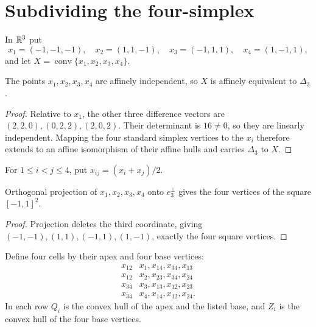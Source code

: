 \section{Subdividing the four-simplex}

\begin{definition}
  \label{constr:tetrahedron}
  In $\mathbb{R}^3$ put
  \[
  x_1=(-1,-1,-1),\quad x_2=(1,1,-1),\quad
  x_3=(-1,1,1),\quad x_4=(1,-1,1),
  \]
  and let $X=\operatorname{conv}\{x_1,x_2,x_3,x_4\}$.
\end{definition}

\begin{lemma}
  \label{lem:tetrahedron-simplex}
  The points $x_1,x_2,x_3,x_4$ are affinely independent, so $X$ is affinely
  equivalent to $\Delta_3$.
\end{lemma}
\begin{proof}
  Relative to $x_1$, the other three difference vectors are
  $(2,2,0),(0,2,2),(2,0,2)$.  Their determinant is $16\neq0$, so they are
  linearly independent.  Mapping the four standard simplex vertices to the
  $x_i$ therefore extends to an affine isomorphism of their affine hulls and
  carries $\Delta_3$ to $X$.
\end{proof}

\begin{definition}
  \label{def:tetrahedron-midpoints}
  For $1\leq i<j\leq4$, put $x_{ij}=(x_i+x_j)/2$.
\end{definition}

\begin{lemma}
  \label{lem:tetrahedron-projection-square}
  Orthogonal projection of $x_1,x_2,x_3,x_4$ onto $e_3^\perp$ gives the four
  vertices of the square $[-1,1]^2$.
\end{lemma}
\begin{proof}
  Projection deletes the third coordinate, giving
  $(-1,-1),(1,1),(-1,1),(1,-1)$, exactly the four square vertices.
\end{proof}

\begin{definition}
  \label{constr:rhombic-cells}
  Define four cells by their apex and four base vertices:
  \[
  \begin{array}{c|c}
  x_{12}&x_1,x_{14},x_{34},x_{13}\\
  x_{12}&x_2,x_{23},x_{34},x_{24}\\
  x_{34}&x_3,x_{13},x_{12},x_{23}\\
  x_{34}&x_4,x_{14},x_{12},x_{24}.
  \end{array}
  \]
  In each row $Q_i$ is the convex hull of the apex and the listed base, and
  $Z_i$ is the convex hull of the four base vertices.
\end{definition}


